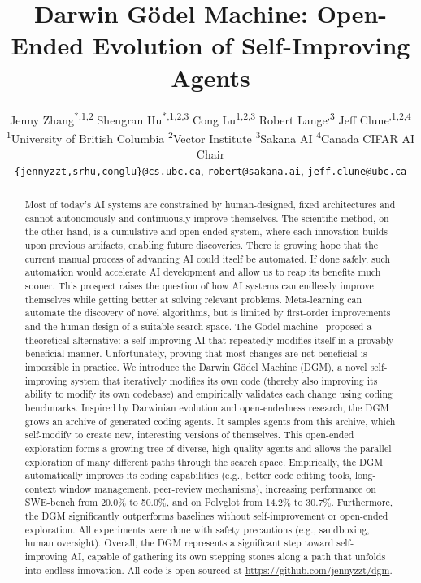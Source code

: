 \documentclass{article}
\title{Darwin G\"odel Machine: Open-Ended Evolution of Self-Improving Agents}
\author{
Jenny Zhang\textsuperscript{*,1,2} \quad
Shengran Hu\textsuperscript{*,1,2,3} \quad
Cong Lu\textsuperscript{1,2,3} \quad
Robert Lange\textsuperscript{\dag,3} \quad
Jeff Clune\textsuperscript{\dag,1,2,4}
\\
\textsuperscript{1}University of British Columbia \quad
\textsuperscript{2}Vector Institute \quad
\textsuperscript{3}Sakana AI \quad
\textsuperscript{4}Canada CIFAR AI Chair
\\
\texttt{\{jennyzzt,srhu,conglu\}@cs.ubc.ca}, \texttt{robert@sakana.ai}, \texttt{jeff.clune@ubc.ca}
}
\begin{document}
\renewcommand{\thefootnote}{\fnsymbol{footnote}}
\renewcommand{\thefootnote}{\arabic{footnote}}

\maketitle

\begin{abstract}
Most of today's AI systems are constrained by human-designed, fixed architectures and cannot autonomously and continuously improve themselves. The scientific method, on the other hand, is a cumulative and open-ended system, where each innovation builds upon previous artifacts, enabling future discoveries. There is growing hope that the current manual process of advancing AI could itself be automated. If done safely, such automation would accelerate AI development and allow us to reap its benefits much sooner. This prospect raises the question of how AI systems can endlessly improve themselves while getting better at solving relevant problems. Meta-learning can automate the discovery of novel algorithms, but is limited by first-order improvements and the human design of a suitable search space. The G\"odel machine~\citep{schmidhuber2007godel} proposed a theoretical alternative: a self-improving AI that repeatedly modifies itself in a provably beneficial manner. Unfortunately, proving that most changes are net beneficial is impossible in practice. We introduce the Darwin G\"odel Machine (DGM), a novel self-improving system that iteratively modifies its own code (thereby also improving its ability to modify its own codebase) and empirically validates each change using coding benchmarks. Inspired by Darwinian evolution and open-endedness research, the DGM grows an archive of generated coding agents. It samples agents from this archive, which self-modify to create new, interesting versions of themselves. This open-ended exploration forms a growing tree of diverse, high-quality agents and allows the parallel exploration of many different paths through the search space. Empirically, the DGM automatically improves its coding capabilities (e.g., better code editing tools, long-context window management, peer-review mechanisms), increasing performance on SWE-bench from 20.0\% to 50.0\%, and on Polyglot from 14.2\% to 30.7\%. Furthermore, the DGM significantly outperforms baselines without self-improvement or open-ended exploration. All experiments were done with safety precautions (e.g., sandboxing, human oversight). Overall, the DGM represents a significant step toward self-improving AI, capable of gathering its own stepping stones along a path that unfolds into endless innovation.
All code is open-sourced at \href{https://github.com/jennyzzt/dgm}{https://github.com/jennyzzt/dgm}.
\end{abstract}
\end{document}
